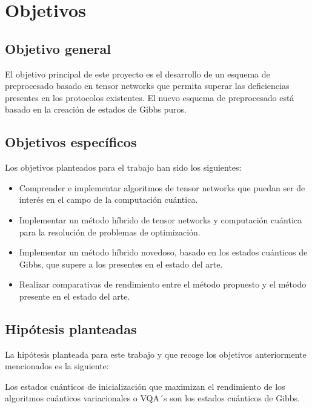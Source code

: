 \chapter{Objetivos}

\section{Objetivo general}

El objetivo principal de este proyecto es el desarrollo de un esquema de preprocesado basado en tensor networks que permita superar las deficiencias presentes en los protocolos existentes. El nuevo esquema de preprocesado está basado en la creación de estados de Gibbs puros.

\section{Objetivos específicos}

Los objetivos planteados para el trabajo han sido los siguientes:

\begin{itemize}
    
    \item Comprender e implementar algoritmos de tensor networks que puedan ser de interés en el campo de la computación cuántica.
    
    \item Implementar un método híbrido de tensor networks y computación cuántica para la resolución de problemas de optimización.
   
    \item Implementar un método híbrido novedoso, basado en los estados cuánticos de Gibbs, que supere a los presentes en el estado del arte.
     
    \item Realizar comparativas de rendimiento entre el método propuesto y el método presente en el estado del arte.

\end{itemize}

\section{Hipótesis planteadas}

La hipótesis planteada para este trabajo y que recoge los objetivos anteriormente mencionados es la siguiente:\\

\begin{mdframed}[backgroundcolor=black!10]
\centering 

Los estados cuánticos de inicialización que maximizan el rendimiento de los algoritmos cuánticos variacionales o VQA´s son los estados cuánticos de Gibbs. 

\end{mdframed}
